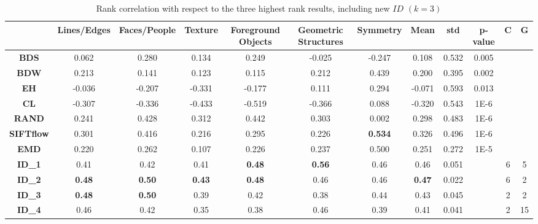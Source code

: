 	
	
	\begin{table}[h]
		\centering
		
		\label{k-3}
		\resizebox{\textwidth}{!}
		{\begin{tabular}{|c|c|c|c|c|c|c|c|c|c|c|c|}
				\hline
				& \textbf{Lines/Edges} & \textbf{Faces/People} & \textbf{Texture} & \textbf{Foreground Objects} & \textbf{Geometric Structures} & \textbf{Symmetry} & \textbf{Mean} & \textbf{std} & \textbf{p-value} & \textbf{C} & \textbf{G} \\ \hline
				\textbf{BDS}      & 0.062  & 0.280     & 0.134    & 0.249    & -0.025  & -0.247  & 0.108   & 0.532   & 0.005   &   &     \\ \hline
				\textbf{BDW}      & 0.213 & 0.141     & 0.123    & 0.115     & 0.212   & 0.439    & 0.200   & 0.395   & 0.002 &  & \\ \hline
				\textbf{EH}       & -0.036    & -0.207    & -0.331    & -0.177   & 0.111     & 0.294  & -0.071  & 0.593  & 0.013   &  & \\ \hline
				\textbf{CL}       & -0.307    & -0.336  & -0.433    & -0.519      & -0.366     & 0.088   & -0.320   & 0.543  & 1E-6    &   &     \\ \hline
				\textbf{RAND}     & 0.241  & 0.428  & 0.312     & 0.442     & 0.303    & 0.002   & 0.298  & 0.483  & 1E-6    &   &    \\ \hline
				\textbf{SIFTflow} & 0.301    & 0.416   & 0.216    & 0.295    & 0.226   &\textbf{ 0.534 }  & 0.326   & 0.496   & 1E-6      &   &   \\ \hline
				\textbf{EMD}      & 0.220    & 0.262    & 0.107   & 0.226     & 0.237   & 0.500   & 0.251   & 0.272  & 1E-5     &    &     \\ \hline
				\textbf{ID\_1}    & 0.41  & 0.42 & 0.41     &\textbf{ 0.48 }  &\textbf{ 0.56 } & 0.46    & 0.46    & 0.051  &   & 6    & 5  \\ \hline
				\textbf{ID\_2}    &\textbf{ 0.48}   & \textbf{0.50 } & \textbf{0.43  }  & \textbf{0.48  }   & 0.46   & 0.46   &\textbf{ 0.47 }  & 0.022  &    & 6  & 2  \\ \hline
				\textbf{ID\_3}    &\textbf{ 0.48 }     & \textbf{0.50}    & 0.39    & 0.42   & 0.38     & 0.44    & 0.43   & 0.045   &   & 2     & 2     \\ \hline
				\textbf{ID\_4}    & 0.46     & 0.42  & 0.35     & 0.38   & 0.46     & 0.39   & 0.41     & 0.041  &   & 2      & 15   \\ \hline
			\end{tabular}}
			
			\caption{Rank correlation with respect to the three highest rank results, including new $ID$ $(k = 3)$} 
		\end{table}
		
